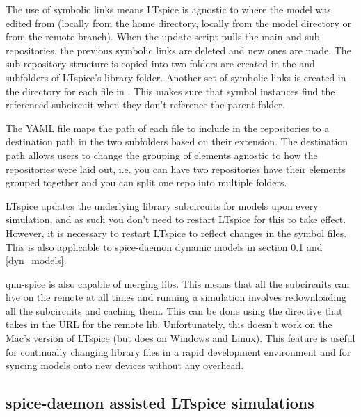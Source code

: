 The use of symbolic links means LTspice is agnostic to where the model was edited from
(locally from the home directory, locally from the model directory or from the remote branch).
When the update script pulls the main and sub repositories, the previous symbolic links are deleted and new ones are 
made. The sub-repository structure is copied into two  folders are created in the  and  
subfolders of LTspice's library folder. Another set of symbolic links is created in the
 directory for each file in . This makes sure that symbol
instances find the referenced subcircuit when they don't reference the parent 
folder.

The YAML file maps the path of each file to include in the repositories to a destination path in the two
 subfolders based on their extension. 
The destination path allows users to change the grouping of elements agnostic to how the repositories
were laid out, i.e. you can have two repositories have their elements grouped together and you can split one
repo into multiple folders. 

LTspice updates the underlying library subcircuits for models upon every simulation,
and as such you don't need to restart LTspice for this to take effect. However,
it is necessary to restart LTspice to reflect changes in the symbol files. This is 
also applicable to spice-daemon dynamic models in section \ref{sd_models} and \ref{dyn_models}.

qnn-spice is also capable of merging libs. This means that all the subcircuits can live
on the remote at all times and running a simulation involves redownloading all the 
subcircuits and caching them. This can be done using the  directive that takes
in the URL for the remote lib.
Unfortunately, this doesn't work on the Mac's version of LTspice  (but does on
Windows and Linux). This feature is useful for continually changing library files in 
a rapid development environment and for syncing models onto new devices without 
any overhead.



\subsection{spice-daemon assisted LTspice simulations}\label{sd_models}

